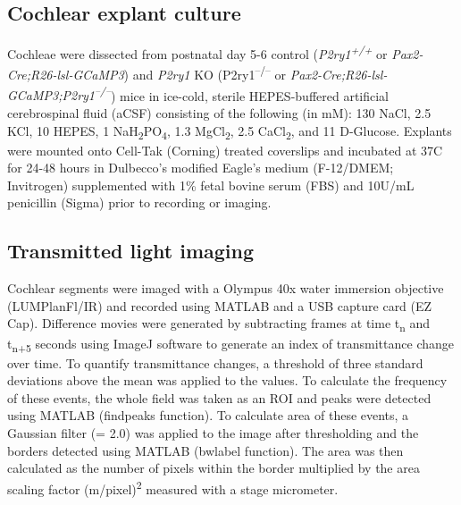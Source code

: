\documentclass[9pt,lineno]{elife}
\begin{document}
\subsection{Cochlear explant culture}
Cochleae were dissected from postnatal day 5-6 control (\textit{P2ry1\textsuperscript{+/+}} or \textit{Pax2-Cre;R26-lsl-GCaMP3}) and \textit{P2ry1} KO (P2ry1\textsuperscript{–/–} or \textit{Pax2-Cre;R26-lsl-GCaMP3;P2ry1\textsuperscript{–/–}}) mice in ice-cold, sterile HEPES-buffered artificial cerebrospinal fluid (aCSF) consisting of the following (in mM): 130 NaCl, 2.5 KCl, 10 HEPES, 1 NaH\textsubscript{2}PO\textsubscript{4}, 1.3 MgCl\textsubscript{2}, 2.5 CaCl\textsubscript{2}, and 11 D-Glucose. Explants were mounted onto Cell-Tak (Corning) treated coverslips and incubated at 37\textdegree C for 24-48 hours in Dulbecco’s modified Eagle’s medium (F-12/DMEM; Invitrogen) supplemented with 1\% fetal bovine serum (FBS) and 10U/mL penicillin (Sigma) prior to recording or imaging. 

\subsection{Transmitted light imaging}
Cochlear segments were imaged with a Olympus 40x water immersion objective (LUMPlanFl/IR) and recorded using MATLAB and a USB capture card (EZ Cap). Difference movies were generated by subtracting frames at time t\textsubscript{n} and t\textsubscript{n+5} seconds using ImageJ software to generate an index of transmittance change over time. To quantify transmittance changes, a threshold of three standard deviations above the mean was applied to the values. To calculate the frequency of these events, the whole field was taken as an ROI and peaks were detected using MATLAB (findpeaks function). To calculate area of these events, a Gaussian filter (\textsigma = 2.0) was applied to the image after thresholding and the borders detected using MATLAB (bwlabel function). The area was then calculated as the number of pixels within the border multiplied by the area scaling factor (\textmu m/pixel)\textsuperscript{2} measured with a stage micrometer.
\end{document}
